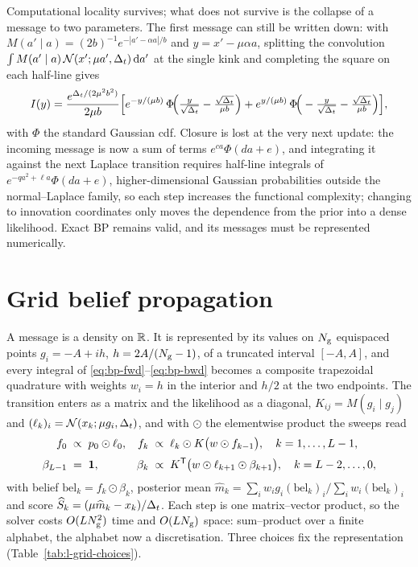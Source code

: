 \noindent Computational locality survives; what does not survive is the
collapse of a message to two parameters. The first message can still be
written down: with $M(a'\mid a) = (2b)^{-1}e^{-|a'-\alpha a|/b}$ and
$y = x' - \mu\alpha a$, splitting the convolution
$\int M(a'\mid a)\,\mathcal{N}(x'; \mu a', \Delta_t)\,\mathrm{d} a'$ at the single kink and
completing the square on each half-line gives
\begin{equation}
  I(y) = \frac{e^{\Delta_t/(2\mu^2b^2)}}{2\mu b}
  \Big[ e^{-y/(\mu b)}\,\Phi\!\Big(\tfrac{y}{\sqrt{\Delta_t}} - \tfrac{\sqrt{\Delta_t}}{\mu b}\Big)
      + e^{y/(\mu b)}\,\Phi\!\Big(-\tfrac{y}{\sqrt{\Delta_t}} - \tfrac{\sqrt{\Delta_t}}{\mu b}\Big) \Big],
  \label{eq:l-first-message}
\end{equation}
with $\Phi$ the standard Gaussian cdf. Closure is lost at the very next
update: the incoming message is now a sum of terms $e^{ca}\Phi(da+e)$, and
integrating it against the next Laplace transition requires half-line
integrals of $e^{-qa^2+\ell a}\Phi(da+e)$, higher-dimensional Gaussian
probabilities outside the normal--Laplace family, so each step increases the
functional complexity; changing to innovation coordinates only moves the
dependence from the prior into a dense likelihood. Exact BP remains valid,
and its messages must be represented numerically.

\section{Grid belief propagation}
\label{sec:l-grid}

A message is a density on $\mathbb{R}$. It is represented by its values on $N_{\mathrm{g}}$
equispaced points $g_i = -A + ih$, $h = 2A/(N_{\mathrm{g}}-1)$, of a truncated
interval $[-A, A]$, and every integral of
\eqref{eq:bp-fwd}--\eqref{eq:bp-bwd} becomes a composite trapezoidal
quadrature with weights $w_i = h$ in the interior and $h/2$ at the two
endpoints. The transition enters as a matrix and the likelihood as a diagonal,
$K_{ij} = M(g_i \mid g_j)$ and $(\ell_k)_i = \mathcal{N}(x_k; \mu g_i, \Delta_t)$, and
with $\odot$ the elementwise product the sweeps read
\begin{align}
  f_0 &\;\propto\; p_0 \odot \ell_0,
  &f_k &\;\propto\; \ell_k \odot K\big( w \odot f_{k-1} \big),
  \quad k = 1,\dots,L-1,
  \label{eq:l-grid-fwd}\\[2pt]
  \beta_{L-1} &\;=\; \mathbf{1},
  &\beta_k &\;\propto\; K^{\mathsf{T}} \big( w \odot \ell_{k+1} \odot \beta_{k+1} \big),
  \quad k = L-2,\dots,0 ,
  \label{eq:l-grid-bwd}
\end{align}
with belief $\mathrm{bel}_k = f_k \odot \beta_k$, posterior mean
$\widehat m_k = \sum_i w_i g_i (\mathrm{bel}_k)_i / \sum_i w_i (\mathrm{bel}_k)_i$
and score $\widehat{S}_k = (\mu\widehat m_k - x_k)/\Delta_t$. Each step is
one matrix--vector product, so the solver costs $O(LN_{\mathrm{g}}^2)$ time and
$O(LN_{\mathrm{g}})$ space: sum--product over a finite alphabet, the alphabet
now a discretisation. Three choices fix the representation
(Table~\ref{tab:l-grid-choices}).

